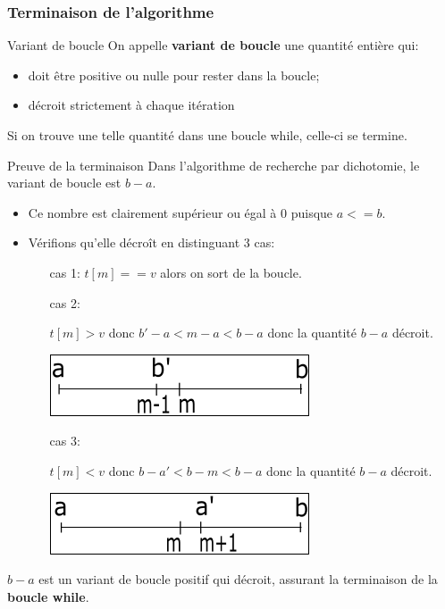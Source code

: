 \documentclass[9pt]{beamer}
\newcounter{num}
\begin{document}
\begin{frame}
\frametitle{Terminaison de l'algorithme}

\begin{block}{Variant de boucle}
On appelle \textbf{variant de boucle} une quantité entière qui:
\begin{itemize}
\item doit être positive ou nulle pour rester dans la boucle;
\item décroit strictement à chaque itération
\end{itemize}
Si on trouve une telle quantité dans une boucle while, celle-ci se termine.
\end{block}

\begin{block}{Preuve de la terminaison}
Dans l'algorithme de recherche par dichotomie, le variant de boucle est $b-a$.
\begin{itemize}
\item Ce nombre est clairement supérieur ou égal à 0 puisque $a<=b$.
\item Vérifions qu'elle décroît en distinguant 3 cas:
\begin{enumerate}
\item[cas 1:] $t[m]==v$ alors on sort de la boucle.\medskip
\item[cas 2:] \begin{minipage}{6cm}
$t[m]>v$ donc $b'-a < m-a < b-a$ donc la quantité $b-a$ décroit.
\end{minipage}\hfill
\begin{minipage}{3.5cm}
\includegraphics[scale=0.4]{../img/cas2.png}
\end{minipage}\medskip
\item[cas 3:] \begin{minipage}{6cm}
$t[m]<v$ donc $b-a' < b-m < b-a$ donc la quantité $b-a$ décroit.
\end{minipage}\hfill
\begin{minipage}{3.5cm}
\includegraphics[scale=0.4]{../img/cas3.png}
\end{minipage}
\end{enumerate}
\end{itemize}
$b-a$ est un variant de boucle positif qui décroit, assurant la terminaison de la \textbf{boucle while}.
\end{block}
\end{frame}
\end{document}
